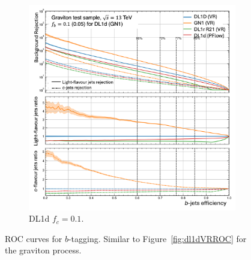 \begin{figure}[h!]
\begin{subfigure}[t]{0.48\textwidth}
    \includegraphics[width=\textwidth]{Images/FTAG/VRDL1d/ROC/grbupf.png}
    \caption{DL1d $f_c = 0.1$.}
    \label{fig:dl1dVRROCgrc}
  \end{subfigure}
  \caption{ROC curves for $b$-tagging. Similar to Figure~\ref{fig:dl1dVRROC} for the graviton process.}
  \label{fig:dl1dVRROCgrav}
\end{figure}

